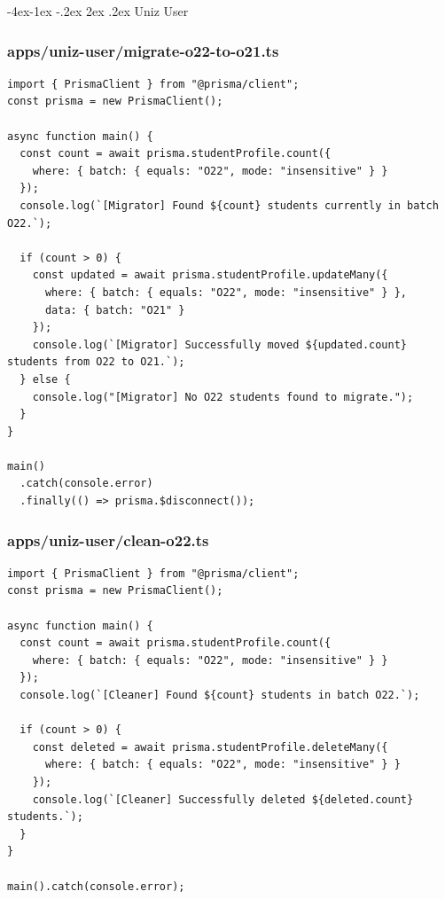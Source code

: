 \documentclass[11pt,a4paper,oneside]{article}
\makeatletter
\renewcommand{\subsection}{\@startsection{subsection}{2}{\z@}%
    {-4ex\@plus -1ex \@minus -.2ex}%
    {2ex \@plus .2ex}%
    {\normalfont\Large\bfseries\color{accent}}}
\makeatother
\begin{document}
\subsection{Uniz User}
\subsubsection*{apps/uniz-user/migrate-o22-to-o21.ts}
\begin{lstlisting}
import { PrismaClient } from "@prisma/client";
const prisma = new PrismaClient();

async function main() {
  const count = await prisma.studentProfile.count({
    where: { batch: { equals: "O22", mode: "insensitive" } }
  });
  console.log(`[Migrator] Found ${count} students currently in batch O22.`);

  if (count > 0) {
    const updated = await prisma.studentProfile.updateMany({
      where: { batch: { equals: "O22", mode: "insensitive" } },
      data: { batch: "O21" }
    });
    console.log(`[Migrator] Successfully moved ${updated.count} students from O22 to O21.`);
  } else {
    console.log("[Migrator] No O22 students found to migrate.");
  }
}

main()
  .catch(console.error)
  .finally(() => prisma.$disconnect());

\end{lstlisting}
\subsubsection*{apps/uniz-user/clean-o22.ts}
\begin{lstlisting}
import { PrismaClient } from "@prisma/client";
const prisma = new PrismaClient();

async function main() {
  const count = await prisma.studentProfile.count({
    where: { batch: { equals: "O22", mode: "insensitive" } }
  });
  console.log(`[Cleaner] Found ${count} students in batch O22.`);

  if (count > 0) {
    const deleted = await prisma.studentProfile.deleteMany({
      where: { batch: { equals: "O22", mode: "insensitive" } }
    });
    console.log(`[Cleaner] Successfully deleted ${deleted.count} students.`);
  }
}

main().catch(console.error);

\end{lstlisting}
\end{document}
